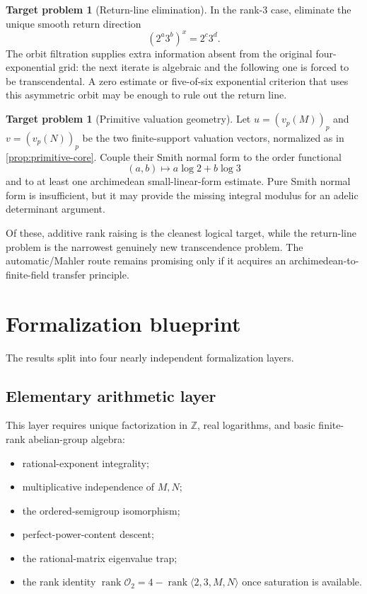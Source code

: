 \documentclass[11pt]{article}
\theoremstyle{definition}
\newtheorem{problem}[theorem]{Target problem}
\newcommand{\Z}{\mathbb{Z}}
\newcommand{\rank}{\operatorname{rank}}
\newcommand{\Orb}{\mathcal{O}}
\begin{document}
\begin{problem}[Return-line elimination]
In the rank-$3$ case, eliminate the unique smooth return direction
\[
       (2^a3^b)^x=2^c3^d.
\]
The orbit filtration supplies extra information absent from the original
four-exponential grid: the next iterate is algebraic and the following one is
forced to be transcendental.  A zero estimate or five-of-six exponential
criterion that uses this asymmetric orbit may be enough to rule out the
return line.
\end{problem}

\begin{problem}[Primitive valuation geometry]
Let $u=(v_p(M))_p$ and $v=(v_p(N))_p$ be the two finite-support valuation
vectors, normalized as in \cref{prop:primitive-core}.  Couple their Smith
normal form to the order functional
\[
       (a,b)\longmapsto a\log2+b\log3
\]
and to at least one archimedean small-linear-form estimate.  Pure Smith
normal form is insufficient, but it may provide the missing integral modulus
for an adelic determinant argument.
\end{problem}

Of these, additive rank raising is the cleanest logical target, while the
return-line problem is the narrowest genuinely new transcendence problem.
The automatic/Mahler route remains promising only if it acquires an
archimedean-to-finite-field transfer principle.

\section{Formalization blueprint}

The results split into four nearly independent formalization layers.

\subsection{Elementary arithmetic layer}

This layer requires unique factorization in $\Z$, real logarithms, and basic
finite-rank abelian-group algebra:
\begin{itemize}
\item rational-exponent integrality;
\item multiplicative independence of $M,N$;
\item the ordered-semigroup isomorphism;
\item perfect-power-content descent;
\item the rational-matrix eigenvalue trap;
\item the rank identity
$\rank\Orb_2=4-\rank\langle2,3,M,N\rangle$ once saturation is available.
\end{itemize}
\end{document}
